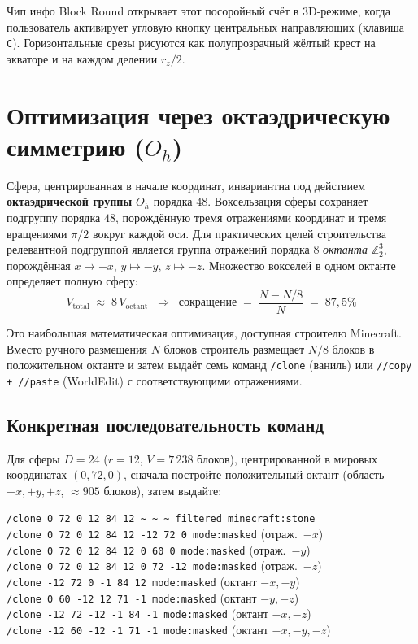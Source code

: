 \documentclass[12pt,a4paper]{scrartcl}
\newcommand{\code}[1]{\texttt{\small #1}}
\newcommand{\acc}[1]{\textcolor{accent}{\textbf{#1}}}
\newcommand{\cmd}[1]{\textcolor{earth}{\texttt{\small #1}}}
\begin{document}
Чип инфо Block Round открывает этот посоройный счёт в 3D-режиме, когда пользователь активирует угловую кнопку центральных направляющих (клавиша \code{C}). Горизонтальные срезы рисуются как полупрозрачный жёлтый крест на экваторе и на каждом делении $r_z/2$.

\section{Оптимизация через октаэдрическую симметрию ($O_h$)}

Сфера, центрированная в начале координат, инвариантна под действием \acc{октаэдрической группы} $O_h$ порядка $48$. Воксельзация сферы сохраняет подгруппу порядка $48$, порождённую тремя отражениями координат и тремя вращениями $\pi/2$ вокруг каждой оси. Для практических целей строительства релевантной подгруппой является группа отражений порядка $8$ \emph{октанта} $\mathbb{Z}_2^3$, порождённая $x \mapsto -x$, $y \mapsto -y$, $z \mapsto -z$. Множество вокселей в одном октанте определяет полную сферу:
\[
V_{\mathrm{total}} \;\approx\; 8\,V_{\mathrm{octant}}\;\;\Longrightarrow\;\;
\text{сокращение}\;=\;\frac{N - N/8}{N} \;=\; 87{,}5\%
\]

Это наибольшая математическая оптимизация, доступная строителю Minecraft. Вместо ручного размещения $N$ блоков строитель размещает $N/8$ блоков в положительном октанте и затем выдаёт семь команд \cmd{/clone} (ваниль) или \cmd{//copy + //paste} (WorldEdit) с соответствующими отражениями.

\subsection{Конкретная последовательность команд}
Для сферы $D=24$ ($r=12$, $V = 7\,238$ блоков), центрированной в мировых координатах $(0,72,0)$, сначала постройте положительный октант (область $+x, +y, +z$, $\approx 905$ блоков), затем выдайте:

\begin{minec}
\cmd{/clone 0 72 0 12 84 12 \textasciitilde\,\textasciitilde\,\textasciitilde\ filtered minecraft:stone}\\
\cmd{/clone 0 72 0 12 84 12 -12 72 0 mode:masked} \quad (отраж.\ \(-x\))\\
\cmd{/clone 0 72 0 12 84 12 0 60 0 mode:masked} \quad\quad (отраж.\ \(-y\))\\
\cmd{/clone 0 72 0 12 84 12 0 72 -12 mode:masked} \quad (отраж.\ \(-z\))\\
\cmd{/clone -12 72 0 -1 84 12 mode:masked} \quad\quad\quad\;\; (октант \(-x,-y\))\\
\cmd{/clone 0 60 -12 12 71 -1 mode:masked} \quad\quad\quad (октант \(-y,-z\))\\
\cmd{/clone -12 72 -12 -1 84 -1 mode:masked} \quad\;\; (октант \(-x,-z\))\\
\cmd{/clone -12 60 -12 -1 71 -1 mode:masked} \quad\;\; (октант \(-x,-y,-z\))
\end{minec}
\end{document}
